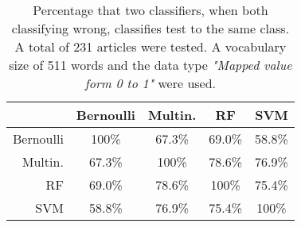 \begin{table}[h]\footnotesize
	\caption{Percentage that two classifiers, when both classifying wrong, classifies test to the same class. A total of 231 articles were tested. A vocabulary size of 511 words and the data type \emph{"Mapped value form 0 to 1"} were used.}
	\begin{tabular}{r|cccc}
	\ 		 	& Bernoulli & Multin. 	&RF 		&SVM \\ \hline
	Bernoulli 	&100\%   	&67.3\%   	&69.0\%   	&58.8\%\\
	Multin. 	&67.3\%  	&100\%   	&78.6\%   	&76.9\%\\
	RF 			&69.0\%   	&78.6\%  	&100\%   	&75.4\%\\
	SVM 		&58.8\%   	&76.9\%   	&75.4\%  	&100\%
	\end{tabular}
	\label{tab:similarity}
\end{table}